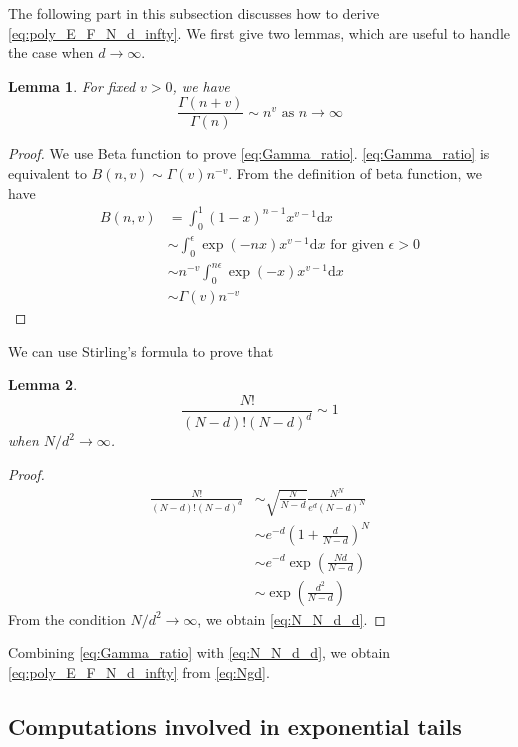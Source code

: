 \documentclass[conference,a4paper]{IEEEtran}
\def\d{\mathrm{d}}
\newtheorem{lemma}{Lemma}
\begin{document}
The following part in this subsection discusses how to derive \eqref{eq:poly_E_F_N_d_infty}.
We first give two lemmas, which are useful to handle the case when $d\to \infty$.
\begin{lemma}\label{lem:Gamma_ratio}
     For fixed $v>0$, we have
     \begin{equation}\label{eq:Gamma_ratio}
         \frac{\Gamma(n+v)}{\Gamma(n)} \sim
         n^v
         \textrm{ as } n \to \infty             
     \end{equation}
 \end{lemma}
 \begin{proof}
     We use Beta function to prove \eqref{eq:Gamma_ratio}.
     \eqref{eq:Gamma_ratio} is equivalent to
     $B(n, v) \sim \Gamma(v) n^{-v}$.
     From the definition of beta function,
     we have
     \begin{align*}
         B(n,v) &=\int_0^1 (1-x)^{n-1} x^{v-1} \d x \\
         &\sim \int_0^{\epsilon} \exp(-nx) x^{v-1}\d x \textrm{ for given } \epsilon>0\\
         & \sim n^{-v} \int_0^{n\epsilon} \exp(-x)x^{v-1}\d x\\
         &\sim \Gamma(v) n^{-v}
     \end{align*}
 \end{proof}
We can use Stirling's formula to prove that
\begin{lemma}
\begin{equation}\label{eq:N_N_d_d}
     \frac{N!}{(N-d)! (N-d)^d} \sim 1
\end{equation}
when $N/d^2 \to \infty$.
\end{lemma}
\begin{proof}
     \begin{align*}
          \frac{N!}{(N-d)! (N-d)^d}
          &\sim \sqrt{\frac{N}{N-d}}\frac{N^N}{ e^d (N-d)^{N}}\\
          &\sim e^{-d} (1+\frac{d}{N-d})^{N} \\
          &\sim e^{-d} \exp(\frac{Nd}{N-d}) \\
          & \sim \exp(\frac{d^2}{N-d})
     \end{align*}
From the condition $N/d^2 \to \infty$,
we obtain \eqref{eq:N_N_d_d}.
\end{proof}
Combining \eqref{eq:Gamma_ratio} with \eqref{eq:N_N_d_d}, we obtain \eqref{eq:poly_E_F_N_d_infty}
from \eqref{eq:Ngd}.

\subsection{Computations involved in exponential tails}
\end{document}
